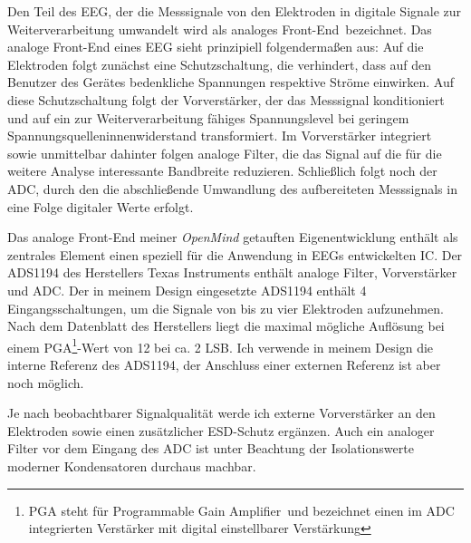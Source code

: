 \documentclass[12pt,a4paper,notitlepage]{article}
\begin{document}
Den Teil des \gls{EEG}, der die Messsignale von den Elektroden in digitale Signale zur Weiterverarbeitung umwandelt wird als \glqq analoges Front-End\grqq\ bezeichnet. Das analoge Front-End eines \gls{EEG} sieht prinzipiell folgendermaßen aus: Auf die Elektroden folgt zunächst eine Schutzschaltung, die verhindert, dass auf den Benutzer des Gerätes bedenkliche Spannungen respektive Ströme einwirken. Auf diese Schutzschaltung folgt der Vorverstärker, der das Messsignal konditioniert und auf ein zur Weiterverarbeitung fähiges Spannungslevel bei geringem Spannungsquelleninnenwiderstand transformiert. Im Vorverstärker integriert sowie unmittelbar dahinter folgen analoge Filter, die das Signal auf die für die weitere Analyse interessante Bandbreite reduzieren. Schließlich folgt noch der \gls{ADC}, durch den die abschließende Umwandlung des aufbereiteten Messsignals in eine Folge digitaler Werte erfolgt.\cite{LINEAR3,MAXIM3,MAXIM9,MAXIM21,MAXIM59,TEXAS12,LINEAR1,LINEAR2,LINEAR4,LINEAR5}

Das analoge Front-End meiner \emph{OpenMind} getauften Eigenentwicklung enthält als zentrales Element einen speziell für die Anwendung in \glspl{EEG} entwickelten \gls{IC}. Der ADS1194 des Herstellers Texas Instruments enthält analoge Filter, Vorverstärker und ADC\cite{TEXAS1}. Der in meinem Design eingesetzte ADS1194 enthält 4 Eingangsschaltungen, um die Signale von bis zu vier Elektroden aufzunehmen. Nach dem Datenblatt des Herstellers liegt die maximal mögliche Auflösung bei einem PGA\footnote{PGA steht für \glqq Programmable Gain Amplifier\grqq\ und bezeichnet einen im ADC integrierten Verstärker mit digital einstellbarer Verstärkung}-Wert von 12 bei ca. 2 \gls{LSB}. Ich verwende in meinem Design die interne Referenz des ADS1194, der Anschluss einer externen Referenz ist aber noch möglich\cite{TEXAS1,TEXAS11,ANALOG6,LINEAR6,MAXIM6}.

Je nach beobachtbarer Signalqualität werde ich externe Vorverstärker an den Elektroden sowie einen zusätzlicher ESD-Schutz ergänzen. Auch ein analoger Filter vor dem Eingang des ADC ist unter Beachtung der Isolationswerte moderner Kondensatoren durchaus machbar\cite{PHILIPS3,PHILIPS4,PHILIPS5,PHILIPS6,WIMA1,STM1,CHEEVER1,NATIONAL2,MAXIM45}.
\end{document}
